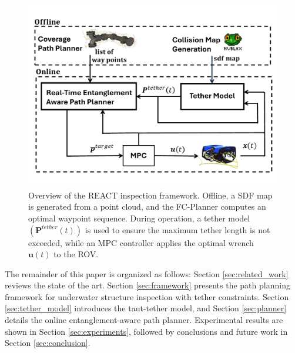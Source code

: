 %
\begin{figure}[t!]
	\centering	\includegraphics[width=0.75\linewidth]{Phd_thesis/figures/REACT_abstract.pdf}
	  \caption{Overview of the \ac{REACT} inspection framework. Offline, a \ac{SDF} map is generated from a point cloud, and the FC-Planner \cite{feng2024fc} computes an optimal waypoint sequence. During operation, a tether model $(\mathbf{P}^{tether}(t))$ is used  to ensure the maximum tether length is not exceeded, while an \ac{MPC} controller applies the optimal wrench $\mathbf{u}(t)$ to the \ac{ROV}.}
    \label{fig:abstract}
\end{figure}
%







The remainder of this paper is organized as follows: Section \ref{sec:related_work} reviews the state of the art. Section \ref{sec:framework} presents the path planning framework for underwater structure inspection with tether constraints. Section \ref{sec:tether_model} introduces the taut-tether model, and Section \ref{sec:planner} details the online entanglement-aware path planner. Experimental results are shown in Section \ref{sec:experiments}, followed by conclusions and future work in Section \ref{sec:conclusion}.





